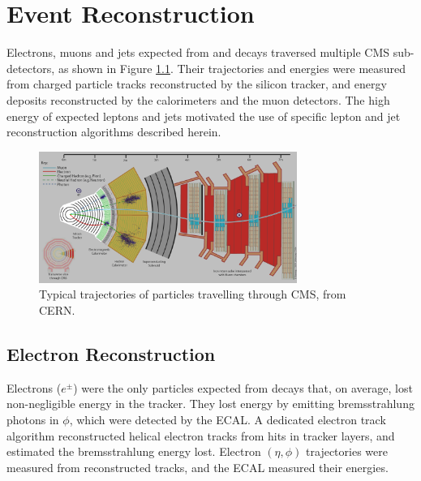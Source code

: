 \chapter{Event Reconstruction}
\label{sec:reco_chapter}

Electrons, muons and jets expected from \WR and \nul decays traversed multiple CMS sub-detectors, 
as shown in Figure \ref{fig:particleTrajectories}.  Their trajectories and energies were measured 
from charged particle tracks reconstructed by the silicon tracker, and energy deposits reconstructed 
by the calorimeters and the muon detectors.  The high energy of expected leptons and jets motivated 
the use of specific lepton and jet reconstruction algorithms described herein.

\begin{figure}[h]
	\centering
	\includegraphics[width=0.75\textwidth]{figures/flowOfParticlesThroughCMS.png}
	\caption{Typical trajectories of particles travelling through CMS, from CERN.}
	\label{fig:particleTrajectories}
\end{figure}


\section{Electron Reconstruction}
\label{sec:eleReco}
Electrons ($e^{\pm}$) were the only particles expected from \WR decays that, on average, lost non-negligible 
energy in the tracker.  They lost energy by emitting bremsstrahlung photons in $\phi$, which were detected 
by the ECAL.  A dedicated electron track algorithm reconstructed helical electron tracks from hits in tracker 
layers, and estimated the bremsstrahlung energy lost.  Electron $(\eta, \phi)$ trajectories were measured 
from reconstructed tracks, and the ECAL measured their energies.

